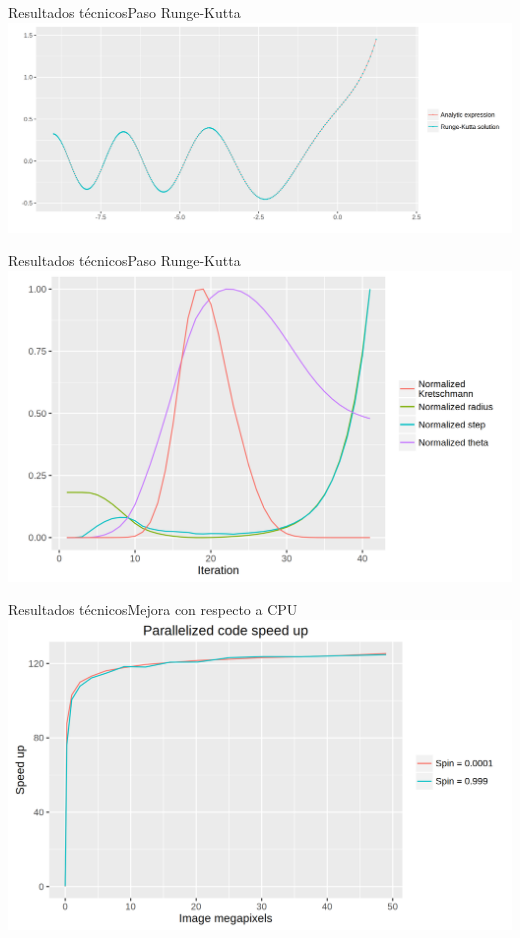 

\begin{frame}{Resultados técnicos}{Paso Runge-Kutta}
	\centering
	\includegraphics[width=0.8\paperwidth]{gfx/analytic}
\end{frame}

\begin{frame}{Resultados técnicos}{Paso Runge-Kutta}
	\centering
	\includegraphics[width=0.7\paperwidth]{gfx/kretschmann}
\end{frame}

\begin{frame}{Resultados técnicos}{Mejora con respecto a CPU}
\centering
\includegraphics[width=0.7\paperwidth]{gfx/speedup}
\end{frame}

